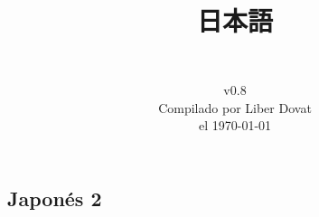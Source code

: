 \documentclass[a4paper,12pt,oneside]{report}
\begin{document}
\begin{CJK*}{UTF8}{min}%



  \title{
    \begin{flushright}
      \Huge  日本語\\
      \LARGE {}
    \end{flushright}
  } %

  \author{\vspace{7cm}\\
    v0.8\\
    Compilado por Liber Dovat\\
    el \today\\
  } %

  \date{}
  \maketitle

  \newpage


  \tableofcontents
  \thispagestyle{plain}

  \newpage




%
%
%


  \chapter{Japon\'es 2}
  \thispagestyle{contenido} %
  \pagestyle{contenido}     %


\end{CJK*}
\end{document}
